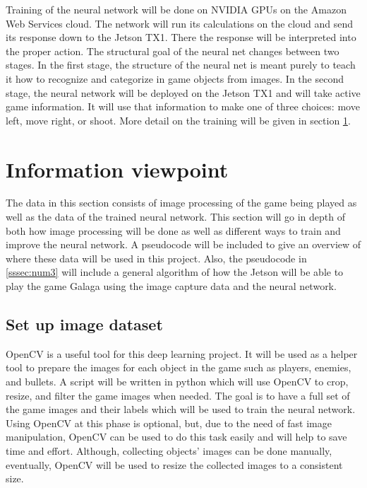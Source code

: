 \documentclass[onecolumn, draftclsnofoot,10pt, compsoc]{IEEEtran}
\begin{document}
\newline
\newline
Training of the neural network will be done on NVIDIA GPUs on the Amazon Web Services cloud.
The network will run its calculations on the cloud and send its response down to the Jetson TX1.
There the response will be interpreted into the proper action.
\newline
\newline
The structural goal of the neural net changes between two stages.
In the first stage, the structure of the neural net is meant purely to teach it how to recognize and categorize in game objects from images.
In the second stage, the neural network will be deployed on the Jetson TX1 and will take active game information.
It will use that information to make one of three choices: move left, move right, or shoot.
More detail on the training will be given in section \ref{sssec:num2}.

\section{Information viewpoint}\label{sssec:num2}%

The data in this section consists of image processing of the game being played as well as the data of the trained neural network.
This section will go in depth of both how image processing will be done as well as different ways to train and improve the neural network.
A pseudocode will be included to give an overview of where these data will be used in this project.
Also, the pseudocode in \ref{sssec:num3} will include a general algorithm of how the Jetson will be able to play the game Galaga using the image capture data and the neural network.

\subsection{Set up image dataset}%

OpenCV is a useful tool for this deep learning project.
It will be used as a helper tool to prepare the images for each object in the game such as players, enemies, and bullets.
A script will be written in python which will use OpenCV to crop, resize, and filter the game images when needed.
The goal is to have a full set of the game images and their labels which will be used to train the neural network.
Using OpenCV at this phase is optional, but, due to the need of fast image manipulation, OpenCV can be used to do this task easily and will help to save time and effort.
Although, collecting objects’ images can be done manually, eventually, OpenCV will be used to resize the collected images to a consistent size.
\end{document}
